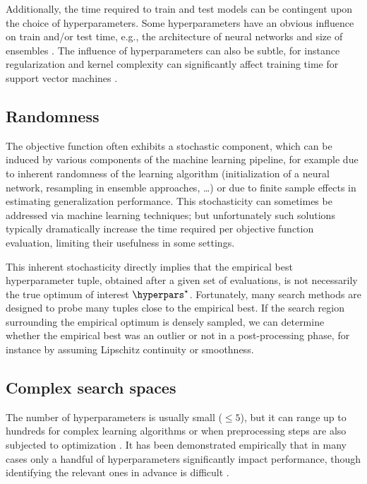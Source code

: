 Additionally, the time required to train and test models can be contingent upon the choice of hyperparameters. Some hyperparameters have an obvious influence on train and/or test time, e.g., the architecture of neural networks \citep{bishop1995neural} and size of ensembles \citep{breiman2001random, ensemblesvm-jmlr}. The influence of hyperparameters can also be subtle, for instance regularization and kernel complexity can significantly affect training time for support vector machines \citep{bottou07svm}.


\subsection{Randomness} \label{randomness}
The objective function often exhibits a stochastic component, which can be induced by various components of the machine learning pipeline, for example due to inherent randomness of the learning algorithm (initialization of a neural network, resampling in ensemble approaches, \ldots) or due to finite sample effects in estimating generalization performance. This stochasticity can sometimes be addressed via machine learning techniques; but unfortunately such solutions typically dramatically increase the time required per objective function evaluation, limiting their usefulness in some settings.

This inherent stochasticity directly implies that the empirical best hyperparameter tuple, obtained after a given set of evaluations, is not necessarily the true optimum of interest $\hyperpars^\star$. Fortunately, many search methods are designed to probe many tuples close to the empirical best. If the search region surrounding the empirical optimum is densely sampled, we can determine whether the empirical best was an outlier or not in a post-processing phase, for instance by assuming Lipschitz continuity or smoothness.

\subsection{Complex search spaces}
The number of hyperparameters is usually small ($\leq5$), but it can range up to hundreds for complex learning algorithms \citep{bergstra2013making} or when preprocessing steps are also subjected to optimization \citep{hutter2009paramils}. It has been demonstrated empirically that in many cases only a handful of hyperparameters significantly impact performance, though identifying the relevant ones in advance is difficult \citep{bergstra2012random}.

